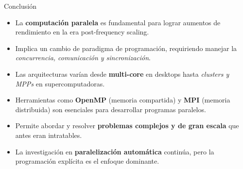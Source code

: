 \begin{frame}{Conclusión}
  \begin{itemize}
      \item La \textbf{computación paralela} es fundamental para lograr aumentos de rendimiento en la era post-frequency scaling.
      \item Implica un cambio de paradigma de programación, requiriendo manejar la \emph{concurrencia, comunicación y sincronización}.
      \item Las arquitecturas varían desde \textbf{multi-core} en desktops hasta \emph{clusters y MPPs} en supercomputadoras.
    \item Herramientas como \textbf{OpenMP} (memoria compartida) y \textbf{MPI} (memoria distribuida) son esenciales para desarrollar programas paralelos.
    \item Permite abordar y resolver \textbf{problemas complejos y de gran escala} que antes eran intratables.
    \item La investigación en \textbf{paralelización automática} continúa, pero la programación explícita es el enfoque dominante.
  \end{itemize}
\end{frame}



